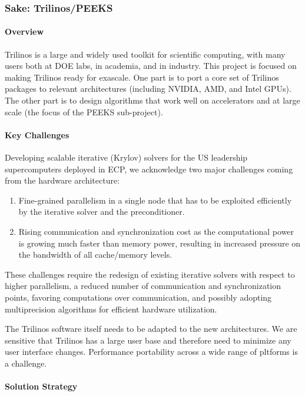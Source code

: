 \subsubsection{ Sake: Trilinos/PEEKS} \label{subsubsect:trilinos}
\paragraph{Overview} 
Trilinos is a large and widely used toolkit for scientific computing, with many users both at DOE labs, in academia, and in industry. 
This project is focused on making Trilinos ready for exascale. One part is to port a core set of Trilinos packages to relevant architectures 
(including NVIDIA, AMD, and Intel GPUs). The other part is to design algorithms that work well on accelerators and at large scale (the focus of 
the PEEKS sub-project).


\paragraph{Key  Challenges}
Developing scalable iterative (Krylov) solvers for the US leadership supercomputers 
deployed in ECP, we acknowledge two major challenges coming from the hardware 
architecture:
\begin{enumerate}
\item 
Fine-grained parallelism in a single node that has to be exploited efficiently 
by the iterative solver and the preconditioner.
\item
Rising communication and synchronization cost as the
computational power is growing much faster than memory power, resulting in 
increased pressure on the bandwidth of all cache/memory levels.
\end{enumerate}

These challenges require the redesign of existing iterative solvers with respect 
to higher parallelism, a reduced number of 
communication and synchronization points, favoring computations over 
communication, and possibly adopting multiprecision algorithms for efficient hardware 
utilization. 

The Trilinos software itself needs to be adapted to the new architectures. We are sensitive that Trilinos has a large user base and therefore need to minimize any user interface changes. Performance portability across a wide range of pltforms is a challenge.

\paragraph{Solution Strategy}

